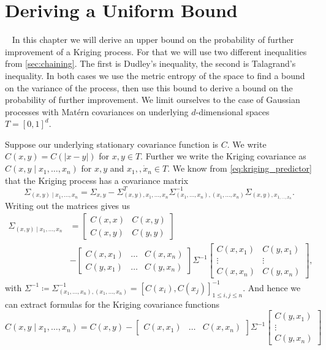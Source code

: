 \chapter{Deriving a Uniform Bound}~\label{chap:bound}
% 
In this chapter we will derive an upper bound on the probability of further improvement of a Kriging process.
For that we will use two different inequalities from \cref{sec:chaining}. The first is Dudley's inequality, the second is Talagrand's inequality. In both cases we use the metric entropy of the space to find a bound on the variance of the process, then use this bound to derive a bound on the probability of further improvement.
We limit ourselves to the case of Gaussian processes with Matérn covariances on underlying $d$-dimensional spaces $T= [0,1]^{d}$.

Suppose our underlying stationary covariance function is $C$. We write $C(x,y) = C(\lvert x-y \rvert)$ for $x,y \in T$.
Further we write the Kriging covariance as
\( C(x,y \mid x_{1}, \dots, x_{n}) \)
for $x,y$ and $x_{1},\dot{,x_{n}} \in T$. 
We know from \cref{eq:kriging_predictor} that the Kriging process has a covariance matrix
\[
    \Sigma_{(x,y) \mid x_{1}, \dots, x_{n}} = \Sigma_{x,y} - \Sigma_{(x,y), x_{1}, \dots, x_{n}}^{T} \Sigma_{(x_{1}, \dots, x_{n}),(x_{1}, \dots, x_{n})}^{-1} \Sigma_{(x,y), x_{1, \dots, x_{n}}}.
\]
Writing out the matrices gives us
\begin{align*}
    \Sigma_{(x,y) \mid x_{1}, \dots, x_{n}} &= 
    \begin{bmatrix}
    C(x,x) & C(x,y)\\
    C(x,y) & C(y,y)
    \end{bmatrix}\\
    &-
    \begin{bmatrix}
    C(x,x_{1}) & \dots & C(x,x_{n}) \\
    C(y,x_{1}) & \dots & C(y,x_{n}) 
    \end{bmatrix}
    \Sigma^{-1}
    \begin{bmatrix}
    C(x,x_{1})  & C(y,x_{1}) \\
    \vdots  & \vdots \\
    C(x,x_{n})  & C(y,x_{n})  
    \end{bmatrix},
\end{align*}
with \( \Sigma^{-1} \coloneqq \Sigma_{(x_{1}, \dots, x_{n}),(x_{1}, \dots, x_{n})}^{-1} = [C(x_{i}),C(x_{j})]_{1 \leq i,j \leq n}^{-1} \).
And hence we can extract formulas for the Kriging covariance functions
\[
    C(x,y \mid x_{1}, \dots, x_{n}) = 
    C(x,y) 
    - 
    \begin{bmatrix}
    C(x,x_{1}) & \dots & C(x,x_{n}) 
    \end{bmatrix}
    \Sigma^{-1}
    \begin{bmatrix}
    C(y,x_{1}) \\
    \vdots \\
    C(y,x_{n}) 
    \end{bmatrix}
\]
